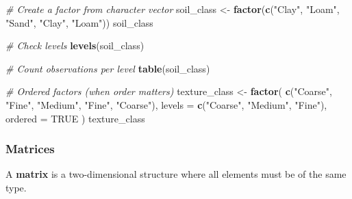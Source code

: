 \documentclass[
  10pt,
  b5paper,
  oneside]{book}
\newenvironment{Shaded}{\begin{snugshade}}{\end{snugshade}}
\newcommand{\AttributeTok}[1]{\textcolor[rgb]{0.13,0.29,0.53}{#1}}
\newcommand{\CommentTok}[1]{\textcolor[rgb]{0.56,0.35,0.01}{\textit{#1}}}
\newcommand{\ConstantTok}[1]{\textcolor[rgb]{0.56,0.35,0.01}{#1}}
\newcommand{\FunctionTok}[1]{\textcolor[rgb]{0.13,0.29,0.53}{\textbf{#1}}}
\newcommand{\NormalTok}[1]{#1}
\newcommand{\OtherTok}[1]{\textcolor[rgb]{0.56,0.35,0.01}{#1}}
\newcommand{\StringTok}[1]{\textcolor[rgb]{0.31,0.60,0.02}{#1}}
\begin{document}
\begin{Shaded}
\begin{Highlighting}[]
\CommentTok{\# Create a factor from character vector}
\NormalTok{soil\_class }\OtherTok{\textless{}{-}} \FunctionTok{factor}\NormalTok{(}\FunctionTok{c}\NormalTok{(}\StringTok{"Clay"}\NormalTok{, }\StringTok{"Loam"}\NormalTok{, }\StringTok{"Sand"}\NormalTok{, }\StringTok{"Clay"}\NormalTok{, }\StringTok{"Loam"}\NormalTok{))}
\NormalTok{soil\_class}

\CommentTok{\# Check levels}
\FunctionTok{levels}\NormalTok{(soil\_class)}

\CommentTok{\# Count observations per level}
\FunctionTok{table}\NormalTok{(soil\_class)}

\CommentTok{\# Ordered factors (when order matters)}
\NormalTok{texture\_class }\OtherTok{\textless{}{-}} \FunctionTok{factor}\NormalTok{(}
  \FunctionTok{c}\NormalTok{(}\StringTok{"Coarse"}\NormalTok{, }\StringTok{"Fine"}\NormalTok{, }\StringTok{"Medium"}\NormalTok{, }\StringTok{"Fine"}\NormalTok{, }\StringTok{"Coarse"}\NormalTok{),}
  \AttributeTok{levels =} \FunctionTok{c}\NormalTok{(}\StringTok{"Coarse"}\NormalTok{, }\StringTok{"Medium"}\NormalTok{, }\StringTok{"Fine"}\NormalTok{),}
  \AttributeTok{ordered =} \ConstantTok{TRUE}
\NormalTok{)}
\NormalTok{texture\_class}
\end{Highlighting}
\end{Shaded}

\subsubsection{Matrices}\label{matrix-data}

A \textbf{matrix} is a two-dimensional structure where all elements must be of the same type.
\end{document}
